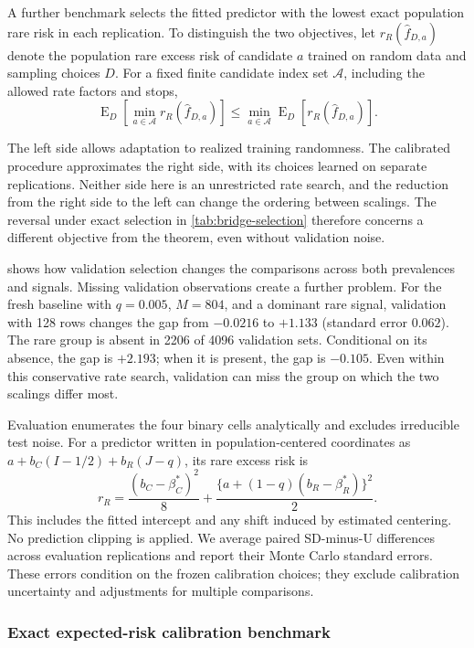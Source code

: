 \documentclass{alt2027}
\DeclareMathOperator{\E}{E}
\begin{document}
A further benchmark selects the fitted predictor with the lowest exact
population rare risk in each replication. To distinguish the two objectives, let
$r_R(\widehat f_{D,a})$ denote the population rare excess risk of candidate $a$
trained on random data and sampling choices $D$. For a fixed finite candidate
index set $\mathcal A$, including the allowed rate factors and stops,
\[
  \E_D\!\left[ \min_{a \in \mathcal A}r_R(\widehat f_{D,a}) \right] \leq \min_{a \in \mathcal A}\E_D\!\left[ r_R(\widehat f_{D,a}) \right].
\]

The left side allows adaptation to realized training randomness. The calibrated
procedure approximates the right side, with its choices learned on separate
replications. Neither side here is an unrestricted rate search, and the
reduction from the right side to the left can change the ordering between
scalings. The reversal under exact selection in \cref{tab:bridge-selection}
therefore concerns a different objective from the theorem, even without
validation noise.

 shows how validation selection changes the
comparisons across both prevalences and signals. Missing validation observations
create a further problem. For the fresh baseline with $q = 0.005$, $M = 804$,
and a dominant rare signal, validation with 128 rows changes the gap from
$-0.0216$ to $+1.133$ (standard error $0.062$). The rare group is absent in 2206
of 4096 validation sets. Conditional on its absence, the gap is $+2.193$; when
it is present, the gap is $-0.105$. Even within this conservative rate search,
validation can miss the group on which the two scalings differ most.

Evaluation enumerates the four binary cells analytically and excludes
irreducible test noise. For a predictor written in population-centered
coordinates as $a + b_C(I - 1/2) + b_R(J - q)$, its rare excess risk is
\[
  r_R = \frac{(b_C - \beta_C^*)^2}{8}
        + \frac{\{a + (1 - q)(b_R - \beta_R^*)\}^2}{2}.
\]
This includes the fitted intercept and any shift induced by estimated centering.
No prediction clipping is applied. We average paired SD-minus-U differences
across evaluation replications and report their Monte Carlo standard errors.
These errors condition on the frozen calibration choices; they exclude
calibration uncertainty and adjustments for multiple comparisons.

\subsubsection{Exact expected-risk calibration benchmark}
\label{sec:bridge-exact-calibration}
\end{document}
